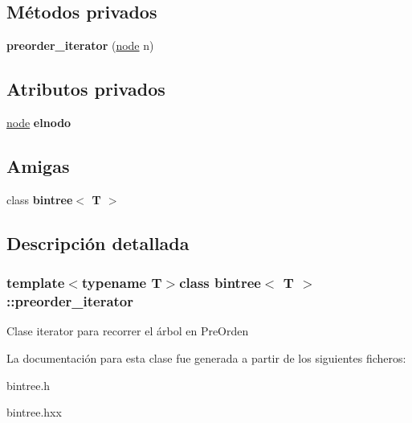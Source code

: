 \subsection*{Métodos privados}
\begin{DoxyCompactItemize}
\item 
\hypertarget{classbintree_1_1preorder__iterator_a1594071974c849d0e3b4830615929f21}{}{\bfseries preorder\+\_\+iterator} (\hyperlink{classbintree_1_1node}{node} n)\label{classbintree_1_1preorder__iterator_a1594071974c849d0e3b4830615929f21}

\end{DoxyCompactItemize}
\subsection*{Atributos privados}
\begin{DoxyCompactItemize}
\item 
\hypertarget{classbintree_1_1preorder__iterator_ab33f0cdff18d6766d26d1e70e2cf6ee3}{}\hyperlink{classbintree_1_1node}{node} {\bfseries elnodo}\label{classbintree_1_1preorder__iterator_ab33f0cdff18d6766d26d1e70e2cf6ee3}

\end{DoxyCompactItemize}
\subsection*{Amigas}
\begin{DoxyCompactItemize}
\item 
\hypertarget{classbintree_1_1preorder__iterator_a300e602ae13bd21fa092c5a5899e9eda}{}class {\bfseries bintree$<$ T $>$}\label{classbintree_1_1preorder__iterator_a300e602ae13bd21fa092c5a5899e9eda}

\end{DoxyCompactItemize}


\subsection{Descripción detallada}
\subsubsection*{template$<$typename T$>$class bintree$<$ T $>$\+::preorder\+\_\+iterator}

Clase iterator para recorrer el árbol en Pre\+Orden 

La documentación para esta clase fue generada a partir de los siguientes ficheros\+:\begin{DoxyCompactItemize}
\item 
bintree.\+h\item 
bintree.\+hxx\end{DoxyCompactItemize}
